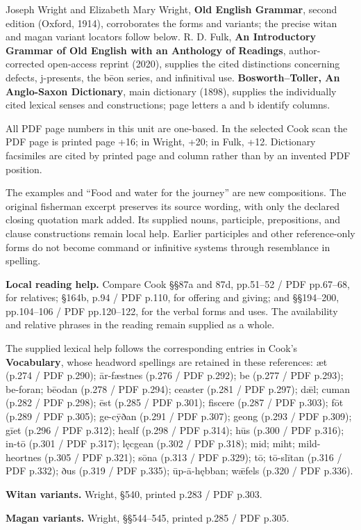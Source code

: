 Joseph Wright and Elizabeth Mary Wright, \textbf{Old English Grammar}, second edition (Oxford, 1914), corroborates the forms and variants; the precise witan and magan variant locators follow below. R. D. Fulk, \textbf{An Introductory Grammar of Old English with an Anthology of Readings}, author-corrected open-access reprint (2020), supplies the cited distinctions concerning defects, j-presents, the bēon series, and infinitival use. \textbf{Bosworth–Toller, An Anglo-Saxon Dictionary}, main dictionary (1898), supplies the individually cited lexical senses and constructions; page letters a and b identify columns.

All PDF page numbers in this unit are one-based. In the selected Cook scan the PDF page is printed page +16; in Wright, +20; in Fulk, +12. Dictionary facsimiles are cited by printed page and column rather than by an invented PDF position.

The examples and “Food and water for the journey” are new compositions. The original fisherman excerpt preserves its source wording, with only the declared closing quotation mark added. Its supplied nouns, participle, prepositions, and clause constructions remain local help. Earlier participles and other reference-only forms do not become command or infinitive systems through resemblance in spelling.

\textbf{Local reading help.} Compare Cook §§87a and 87d, pp.51–52 /\allowbreak{} PDF pp.67–68, for relatives; §164b, p.94 /\allowbreak{} PDF p.110, for offering and giving; and §§194–200, pp.104–106 /\allowbreak{} PDF pp.120–122, for the verbal forms and uses. The availability and relative phrases in the reading remain supplied as a whole.

The supplied lexical help follows the corresponding entries in Cook’s \textbf{Vocabulary}, whose headword spellings are retained in these references: æt (p.274 /\allowbreak{} PDF p.290); ār-fæstnes (p.276 /\allowbreak{} PDF p.292); be (p.277 /\allowbreak{} PDF p.293); be-foran; bēodan (p.278 /\allowbreak{} PDF p.294); ceaster (p.281 /\allowbreak{} PDF p.297); dǣl; cuman (p.282 /\allowbreak{} PDF p.298); ēst (p.285 /\allowbreak{} PDF p.301); fiscere (p.287 /\allowbreak{} PDF p.303); fōt (p.289 /\allowbreak{} PDF p.305); ge-cȳðan (p.291 /\allowbreak{} PDF p.307); geong (p.293 /\allowbreak{} PDF p.309); gīet (p.296 /\allowbreak{} PDF p.312); healf (p.298 /\allowbreak{} PDF p.314); hūs (p.300 /\allowbreak{} PDF p.316); in-tō (p.301 /\allowbreak{} PDF p.317); lęcgean (p.302 /\allowbreak{} PDF p.318); mid; miht; mild-heortnes (p.305 /\allowbreak{} PDF p.321); sōna (p.313 /\allowbreak{} PDF p.329); tō; tō-slītan (p.316 /\allowbreak{} PDF p.332); ðus (p.319 /\allowbreak{} PDF p.335); ūp-ā-hębban; wǣfels (p.320 /\allowbreak{} PDF p.336).

\textbf{Witan variants.} Wright, §540, printed p.283 /\allowbreak{} PDF p.303.

\textbf{Magan variants.} Wright, §§544–545, printed p.285 /\allowbreak{} PDF p.305.

\endgroup

